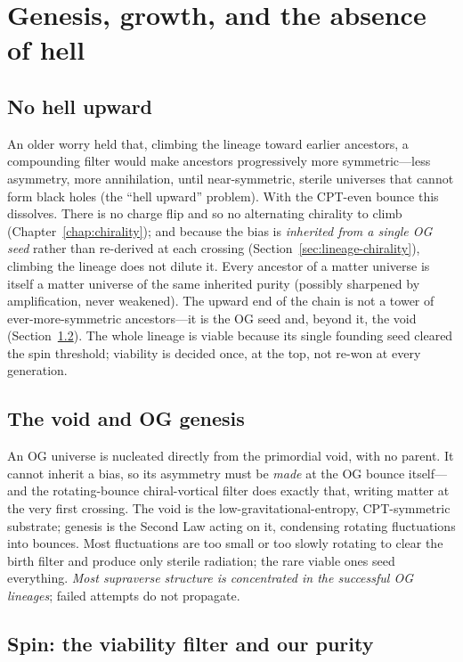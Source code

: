 \section{Genesis, growth, and the absence of hell}

\subsection{No hell upward}

An older worry held that, climbing the lineage toward earlier ancestors, a
compounding filter would make ancestors progressively more symmetric---less
asymmetry, more annihilation, until near-symmetric, sterile universes that cannot
form black holes (the ``hell upward'' problem). With the CPT-even bounce this
dissolves. There is no charge flip and so no alternating chirality to climb
(Chapter~\ref{chap:chirality}); and because the bias is \emph{inherited from a
single OG seed} rather than re-derived at each crossing
(Section~\ref{sec:lineage-chirality}), climbing the lineage does not dilute it.
Every ancestor of a matter universe is itself a matter universe of the same
inherited purity (possibly sharpened by amplification, never weakened). The upward
end of the chain is not a tower of ever-more-symmetric ancestors---it is the OG
seed and, beyond it, the void (Section~\ref{sec:genesis-void}). The whole lineage
is viable because its single founding seed cleared the spin threshold; viability
is decided once, at the top, not re-won at every generation.

\subsection{The void and OG genesis}
\label{sec:genesis-void}

An OG universe is nucleated directly from the primordial void, with no parent. It
cannot inherit a bias, so its asymmetry must be \emph{made} at the OG bounce
itself---and the rotating-bounce chiral-vortical filter does exactly that,
writing matter at the very first crossing. The void is the
low-gravitational-entropy, CPT-symmetric substrate; genesis is the Second Law
acting on it, condensing rotating fluctuations into bounces. Most fluctuations
are too small or too slowly rotating to clear the birth filter and produce only
sterile radiation; the rare viable ones seed everything. \emph{Most supraverse
structure is concentrated in the successful OG lineages}; failed attempts do not
propagate.

\subsection{Spin: the viability filter and our purity}
\label{sec:spin-dist}

